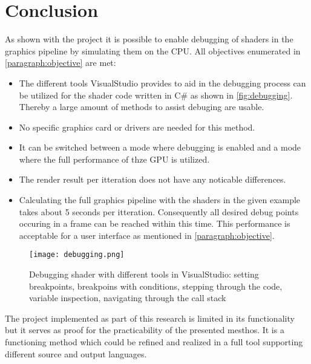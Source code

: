 
\chapter{Conclusion}\label{cha:Conclusion}

As shown with the project  it is possible to enable debugging of shaders in the graphics pipeline by simulating them on the CPU. All objectives enumerated in \autoref{paragraph:objective} are met:

\begin{itemize}
\item The different tools VisualStudio provides to aid in the debugging process can be utilized for the shader code written in C\# as shown in \autoref{fig:debugging}. Thereby a large amount of methods to assist debuging are usable.
\item No specific graphics card or drivers are needed for this method. 
\item It can be switched between a mode where debugging is enabled and a mode where the full performance of thze GPU is utilized.
\item The render result per itteration does not have any noticable differences.
\item Calculating the full graphics pipeline with the shaders in the given example takes about 5 seconds per itteration. Consequently all desired debug points occuring in a frame can be reached within this time. This performance is acceptable for a user interface as mentioned in \autoref{paragraph:objective}.
\end{itemize}

\begin{figure}[h!]
  \centering 
  \texttt{[image: debugging.png]}
  \caption[Screenshot of debug screen within VisualStudio]{Debugging shader with different tools in VisualStudio: setting breakpoints, breakpoins with conditions, stepping through the code, variable inspection, navigating through the call stack}
  \label{fig:debugging}
\end{figure}

The project implemented as part of this research is limited in its functionality but it serves as proof for the practicability of the presented mesthos.  It is a functioning method which could be refined and realized in a full tool supporting different source and output languages.




